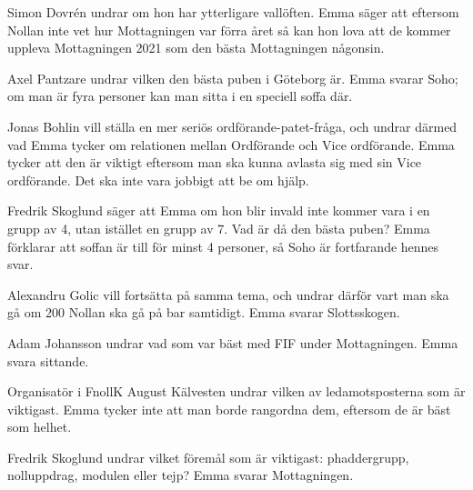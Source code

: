\documentclass[hidelinks]{sektionsmote}
\begin{document}
Simon Dovrén undrar om hon har ytterligare vallöften.
Emma säger att eftersom Nollan inte vet hur Mottagningen var förra året så kan hon lova att de kommer uppleva Mottagningen 2021 som den bästa Mottagningen någonsin.\par
Axel Pantzare undrar vilken den bästa puben i Göteborg är.
Emma svarar Soho; om man är fyra personer kan man sitta i en speciell soffa där.\par
Jonas Bohlin vill ställa en mer seriös ordförande-patet-fråga, och undrar därmed vad Emma tycker om relationen mellan Ordförande och Vice ordförande.
Emma tycker att den är viktigt eftersom man ska kunna avlasta sig med sin Vice ordförande.
Det ska inte vara jobbigt att be om hjälp.\par
Fredrik Skoglund säger att Emma om hon blir invald inte kommer vara i en grupp av 4, utan istället en grupp av 7.
Vad är då den bästa puben?
Emma förklarar att soffan är till för minst 4 personer, så Soho är fortfarande hennes svar.\par
Alexandru Golic vill fortsätta på samma tema, och undrar därför vart man ska gå om 200 Nollan ska gå på bar samtidigt.
Emma svarar Slottsskogen.\par
Adam Johansson undrar vad som var bäst med FIF under Mottagningen.
Emma svara sittande.\par
Organisatör i FnollK August Kälvesten undrar vilken av ledamotsposterna som är viktigast.
Emma tycker inte att man borde rangordna dem, eftersom de är bäst som helhet.\par
Fredrik Skoglund undrar vilket föremål som är viktigast: phaddergrupp, nolluppdrag, modulen eller tejp?
Emma svarar Mottagningen.
\end{document}
